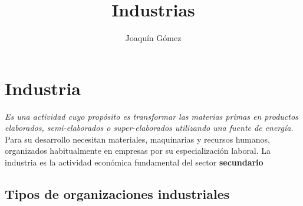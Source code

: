 \documentclass{report}
\title{Industrias}
\author{Joaquín Gómez}
\begin{document}
\maketitle

\chapter{Industria}
\textit{Es una actividad cuyo propósito es transformar las materias primas en productos
    elaborados, semi-elaborados o super-elaborados utilizando una fuente de
    energía}. Para su desarrollo necesitan materiales, maquinarias y recursos
humanos, organizados habitualmente en empresas por su especialización laboral.
La industria es la actividad económica fundamental del sector
\textbf{secundario}

\section{Tipos de organizaciones industriales}
\end{document}
